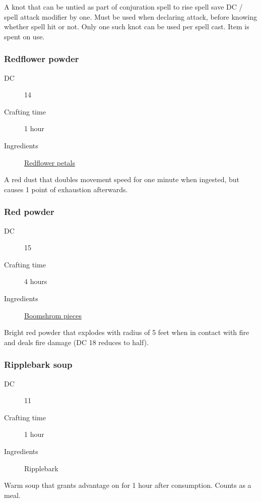 A knot that can be untied as part of conjuration spell to rise  spell save DC / spell attack modifier by one. Must be used when declaring attack, before knowing whether spell hit or not. Only one such knot can be used per spell cast. Item is spent on use.

\subsubsection{Redflower powder}
\label{Redflower powder}

\begin{description}
\item [DC] 14 \survival
\item [Crafting time] 1 hour
\item [Ingredients] \hyperref[Redflower]{Redflower petals}
\end{description}

A red dust that doubles movement speed for one minute when ingested, but causes 1 point of exhaustion afterwards.

\subsubsection{Red powder}
\label{Red powder}

\begin{description}
\item [DC] 15 \nature
\item [Crafting time] 4 hours
\item [Ingredients] \hyperref[Boomsrhoom]{Boomshrom pieces}
\end{description}

Bright red powder that explodes with radius of 5 feet when in contact with fire and deals  fire damage (DC 18 \dexteritysave{} reduces to half).

\subsubsection{Ripplebark soup}

\begin{description}
\item [DC] 11 \survival
\item [Crafting time] 1 hour
\item [Ingredients] Ripplebark
\end{description}

Warm soup that grants advantage on \acrobatics for 1 hour after consumption. Counts as a meal.

